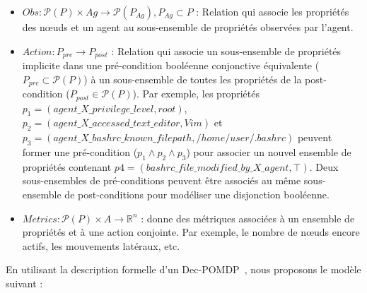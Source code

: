 \begin{itemize}
    \item $Obs : \mathcal{P}(P) \times Ag \rightarrow \mathcal{P}(P_{Ag}), P_{Ag} \subset P$ : Relation qui associe les propriétés des nœuds et un agent au sous-ensemble de propriétés observées par l'agent.



    \item $Action : P_{pre} \rightarrow P_{post}$ : Relation qui associe un sous-ensemble de propriétés implicite dans une pré-condition booléenne conjonctive équivalente ($P_{pre} \subset \mathcal{P}(P)$) à un sous-ensemble de toutes les propriétés de la post-condition ($P_{post} \in \mathcal{P}(P)$). Par exemple, les propriétés $p_1 = (agent\_X\_privilege\_level, \allowbreak root)$, $p_2 = (agent\_X\_accessed\_text\_editor, \allowbreak Vim)$ et $p_3 = (agent\_X\_bashrc\_known\_filepath, \allowbreak /home/user/.bashrc)$ peuvent former une pré-condition ($p_1 \land p_2 \land p_3$) pour associer un nouvel ensemble de propriétés contenant $p4 = (bashrc\_file\_modified\_by\_X\_agent, \top)$. Deux sous-ensembles de pré-conditions peuvent être associés au même sous-ensemble de post-conditions pour modéliser une disjonction booléenne.

    \item $Metrics: \mathcal{P}(P) \times A \rightarrow \mathbb{R}^{n}$ : donne des métriques associées à un ensemble de propriétés et à une action conjointe. Par exemple, le nombre de nœuds encore actifs, les mouvements latéraux, etc.

\end{itemize}


En utilisant la description formelle d'un Dec-POMDP~\cite{OliehoekA16}, nous proposons le modèle suivant :

